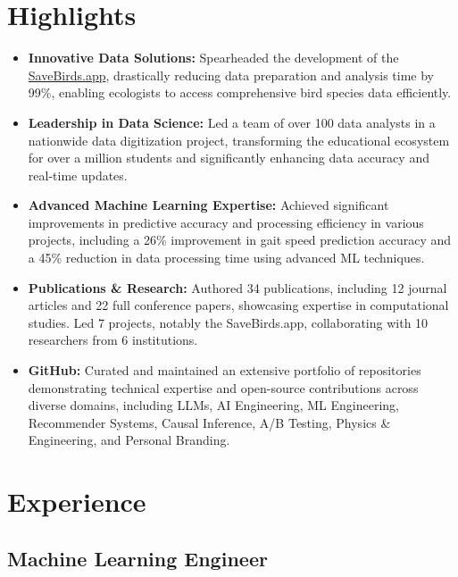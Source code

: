 \documentclass[11pt]{article} %
\begin{document}
\section{Highlights}
\begin{itemize}[itemsep=5pt]
	\item \textbf{Innovative Data Solutions:} Spearheaded the development of the \href{https://savebirds.app/}{SaveBirds.app}, drastically reducing data preparation and analysis time by 99\%, enabling ecologists to access comprehensive bird species data efficiently.
	\item \textbf{Leadership in Data Science:} Led a team of over 100 data analysts in a nationwide data digitization project, transforming the educational ecosystem for over a million students and significantly enhancing data accuracy and real-time updates.
	\item \textbf{Advanced Machine Learning Expertise:} Achieved significant improvements in predictive accuracy and processing efficiency in various projects, including a 26\% improvement in gait speed prediction accuracy and a 45\% reduction in data processing time using advanced ML techniques.
	\item \textbf{Publications \& Research:} Authored 34 publications, including 12 journal articles and 22 full conference papers, showcasing expertise in computational studies. Led 7 projects, notably the SaveBirds.app, collaborating with 10 researchers from 6 institutions. 
	\item \textbf{GitHub:} Curated and maintained an extensive portfolio of repositories demonstrating technical expertise and open-source contributions across diverse domains, including LLMs, AI Engineering, ML Engineering, Recommender Systems, Causal Inference, A/B Testing, Physics \& Engineering, and Personal Branding.
\end{itemize}

\section{Experience}
\subsection{Machine Learning Engineer}
\end{document}
